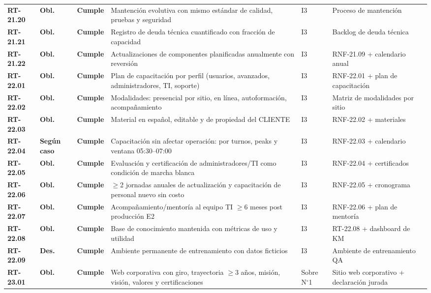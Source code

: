 \begin{small}
\begin{longtable}{@{}p{1.35cm} p{1.15cm} p{1.15cm} p{4.6cm} p{2.35cm} p{3.8cm}@{}}
\textbf{RT-21.20} & \textbf{Obl.} & \textbf{Cumple} & Mantenci\'on evolutiva con mismo est\'andar de calidad, pruebas y seguridad & I3 & Proceso de mantenci\'on \\
\textbf{RT-21.21} & \textbf{Obl.} & \textbf{Cumple} & Registro de deuda t\'ecnica cuantificado con fracci\'on de capacidad & I3 & Backlog de deuda t\'ecnica \\
\textbf{RT-21.22} & \textbf{Obl.} & \textbf{Cumple} & Actualizaciones de componentes planificadas anualmente con reversi\'on & I3 & RNF-21.09 + calendario anual \\
\textbf{RT-22.01} & \textbf{Obl.} & \textbf{Cumple} & Plan de capacitaci\'on por perfil (usuarios, avanzados, administradores, TI, soporte) & I3 & RNF-22.01 + plan de capacitaci\'on \\
\textbf{RT-22.02} & \textbf{Obl.} & \textbf{Cumple} & Modalidades: presencial por sitio, en l\'inea, autoformaci\'on, acompa\~namiento & I3 & Matriz de modalidades por sitio \\
\textbf{RT-22.03} & \textbf{Obl.} & \textbf{Cumple} & Material en espa\~nol, editable y de propiedad del CLIENTE & I3 & RNF-22.02 + materiales \\
\textbf{RT-22.04} & \textbf{Según caso} & \textbf{Cumple} & Capacitaci\'on sin afectar operaci\'on: por turnos, peaks y ventana 05:30–07:00 & I3 & RNF-22.03 + calendario \\
\textbf{RT-22.05} & \textbf{Obl.} & \textbf{Cumple} & Evaluaci\'on y certificaci\'on de administradores/TI como condici\'on de marcha blanca & I3 & RNF-22.04 + certificados \\
\textbf{RT-22.06} & \textbf{Obl.} & \textbf{Cumple} & $\geq$2 jornadas anuales de actualizaci\'on y capacitaci\'on de personal nuevo sin costo & I3 & RNF-22.05 + cronograma \\
\textbf{RT-22.07} & \textbf{Obl.} & \textbf{Cumple} & Acompa\~namiento/mentor\'ia al equipo TI $\geq$6 meses post producci\'on E2 & I3 & RNF-22.06 + plan de mentor\'ia \\
\textbf{RT-22.08} & \textbf{Obl.} & \textbf{Cumple} & Base de conocimiento mantenida con m\'etricas de uso y utilidad & I3 & RT-22.08 + dashboard de KM \\
\textbf{RT-22.09} & \textbf{Des.} & \textbf{Cumple} & Ambiente permanente de entrenamiento con datos ficticios & I3 & Ambiente de entrenamiento QA \\
\textbf{RT-23.01} & \textbf{Obl.} & \textbf{Cumple} & Web corporativa con giro, trayectoria $\geq$3 a\~nos, misi\'on, visi\'on, valores y certificaciones & Sobre N$^{\circ}$1 & Sitio web corporativo + declaraci\'on jurada \\

\end{longtable}
\end{small}
